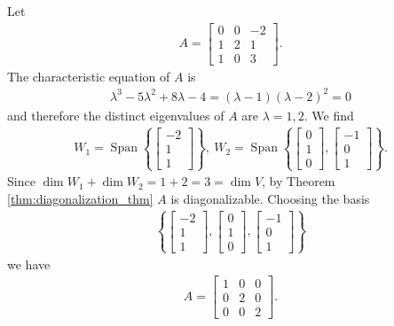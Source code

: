\documentclass[12pt,letterpaper,reqno]{article}
\numberwithin{equation}{section}
\DeclareMathOperator{\Span}{Span}
\begin{document}
\begin{example}
Let 
\begin{align*}
	A=\begin{bmatrix}
		0 & 0 & -2 \\
		1 & 2 & 1 \\
		1 & 0 & 3
	\end{bmatrix}.
\end{align*}	
The characteristic equation of $A$ is 
\begin{align*}
	\lambda^3-5\lambda^2+8\lambda-4=(\lambda-1)(\lambda-2)^2=0
\end{align*}
and therefore the distinct eigenvalues of $A$ are $\lambda=1,2$. We find
\begin{align*}
	W_1=\Span \left\{\begin{bmatrix}
		-2 \\ 1 \\ 1
	\end{bmatrix}\right\}, \ W_2=\Span \left\{\begin{bmatrix}
		0 \\ 1 \\ 0
	\end{bmatrix}, \begin{bmatrix}
		-1 \\ 0 \\ 1
	\end{bmatrix}\right\}.
\end{align*}
Since $\dim W_1+\dim W_2=1+2=3=\dim V$, by Theorem \ref{thm:diagonalization_thm} $A$ is diagonalizable. Choosing the basis 
\begin{align*}
	\left\{\begin{bmatrix}
		-2 \\ 1 \\ 1
	\end{bmatrix}, \begin{bmatrix}
		0 \\ 1 \\ 0
	\end{bmatrix}, \begin{bmatrix}
		-1 \\ 0 \\ 1
	\end{bmatrix} \right\}
\end{align*}
we have 
\begin{align*}
	A=\begin{bmatrix}
		1 & 0 & 0 \\
		0 & 2 & 0 \\
		0 & 0 & 2
	\end{bmatrix}.
\end{align*}
\end{example}
 
\end{document}
